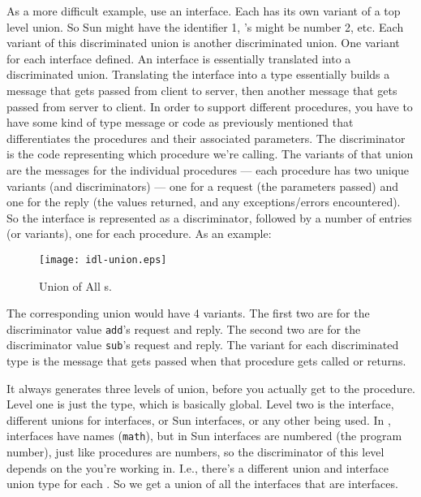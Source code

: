 As a more difficult example, use an interface.  Each \IDL{} has its own variant of
a top level union.  So Sun \RPC{} might have the identifier 1, \CORBA{}'s \IDL{} might
be number 2, etc.  Each variant of this discriminated union is another
discriminated union.  One variant for each interface defined.  An interface is
essentially translated into a discriminated union.  Translating the interface
into a \MINT{} type essentially builds a message that gets passed from client to
server, then another message that gets passed from server to client.  In order
to support different procedures, you have to have some kind of type message or
code as previously mentioned that differentiates the procedures and their
associated parameters.  The discriminator is the code representing which
procedure we're calling.  The variants of that union are the messages for the
individual procedures --- each procedure has two unique variants (and
discriminators) --- one for a request (the parameters passed) and one for the
reply (the values returned, and any exceptions/errors encountered).  So the
interface is represented as a discriminator, followed by a number of entries
(or variants), one for each procedure.  As an example:

\begin{figure}
  \begin{center}
    \texttt{[image: idl-union.eps]}
  \end{center}
  \caption{Union of All \IDL{}s.}
  \label{idl-union}
\end{figure}

The corresponding union would have 4 variants.  The first two are for the
discriminator value \texttt{add}'s request and reply.  The second two are for
the discriminator value \texttt{sub}'s request and reply.  The variant for each
discriminated type is the message that gets passed when that procedure gets
called or returns.

It always generates three levels of union, before you actually get to the
procedure.  Level one is just the \IDL{} type, which is basically global.  Level
two is the interface, different unions for \CORBA{} interfaces, or Sun interfaces,
or any other \IDL{} being used.  In \CORBA{}, interfaces have names (\texttt{math}),
but in Sun interfaces are numbered (the program number), just like procedures
are numbers, so the discriminator of this level depends on the \IDL{} you're
working in.  I.e., there's a different union and interface union type for each
\IDL{}\@.  So we get a union of all the interfaces that are \AOI{} interfaces.

